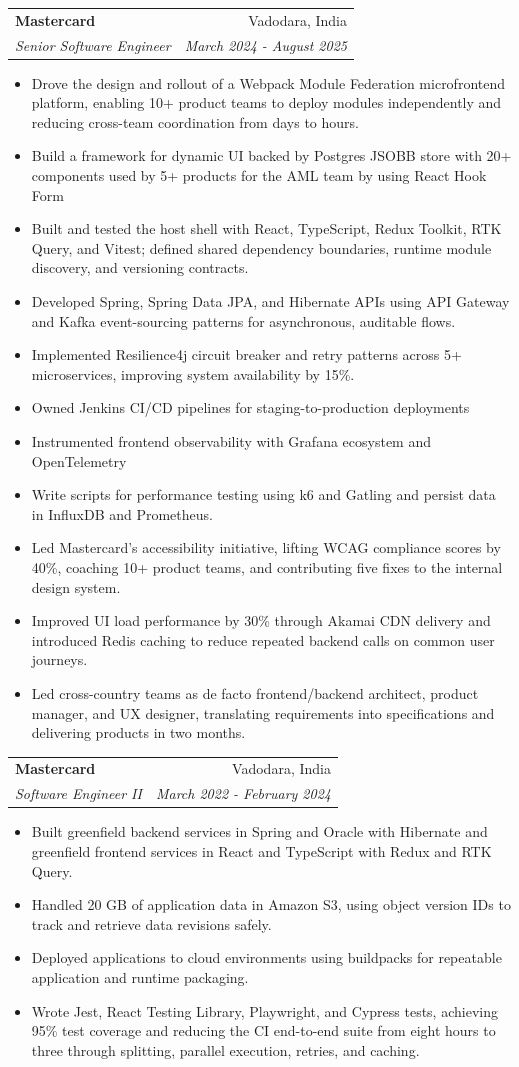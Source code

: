 \documentclass[a4paper,10pt]{article}
\makeatletter
\newcommand{\resumeItem}[1]{\item {\small #1}}
\newcommand{\resumeSubheading}[4]{
  \item
  \begin{tabular*}{1.0\textwidth}[t]{l@{\extracolsep{\fill}}r}
    \textbf{#1} & {\small #2} \\
    \textit{\small #3} & \textit{\small #4} \\
  \end{tabular*}\vspace{-4pt}
}
\newcommand{\resumeItemListStart}{\begin{itemize}}
\newcommand{\resumeItemListEnd}{\end{itemize}}
\makeatother
\begin{document}
    \resumeSubheading
      {Mastercard}{Vadodara, India}
      {Senior Software Engineer}{March 2024 - August 2025}
      \resumeItemListStart
        \resumeItem{Drove the design and rollout of a Webpack Module Federation microfrontend platform, enabling 10+ product teams to deploy modules independently and reducing cross-team coordination from days to hours.}
        \resumeItem{Build a framework for dynamic UI backed by Postgres JSOBB store with 20+ components used by 5+ products for the AML team by using React Hook Form}
        \resumeItem{Built and tested the host shell with React, TypeScript, Redux Toolkit, RTK Query, and Vitest; defined shared dependency boundaries, runtime module discovery, and versioning contracts.}
        \resumeItem{Developed Spring, Spring Data JPA, and Hibernate APIs using API Gateway and Kafka event-sourcing patterns for asynchronous, auditable flows.}
        \resumeItem{Implemented Resilience4j circuit breaker and retry patterns across 5+ microservices, improving system availability by 15\%.}
        \resumeItem{Owned Jenkins CI/CD pipelines for staging-to-production deployments}
        \resumeItem{Instrumented frontend observability with Grafana ecosystem and OpenTelemetry}
        \resumeItem{Write scripts for performance testing using k6 and Gatling and persist data in InfluxDB and Prometheus.}
        \resumeItem{Led Mastercard's accessibility initiative, lifting WCAG compliance scores by 40\%, coaching 10+ product teams, and contributing five fixes to the internal design system.}
        \resumeItem{Improved UI load performance by 30\% through Akamai CDN delivery and introduced Redis caching to reduce repeated backend calls on common user journeys.}
        \resumeItem{Led cross-country teams as de facto frontend/backend architect, product manager, and UX designer, translating requirements into specifications and delivering products in two months.}
      \resumeItemListEnd

    \resumeSubheading
      {Mastercard}{Vadodara, India}
      {Software Engineer II}{March 2022 - February 2024}
      \resumeItemListStart
        \resumeItem{Built greenfield backend services in Spring and Oracle with Hibernate and greenfield frontend services in React and TypeScript with Redux and RTK Query.}
        \resumeItem{Handled 20 GB of application data in Amazon S3, using object version IDs to track and retrieve data revisions safely.}
        \resumeItem{Deployed applications to cloud environments using buildpacks for repeatable application and runtime packaging.}
        \resumeItem{Wrote Jest, React Testing Library, Playwright, and Cypress tests, achieving 95\% test coverage and reducing the CI end-to-end suite from eight hours to three through splitting, parallel execution, retries, and caching.}
      \resumeItemListEnd
\end{document}
